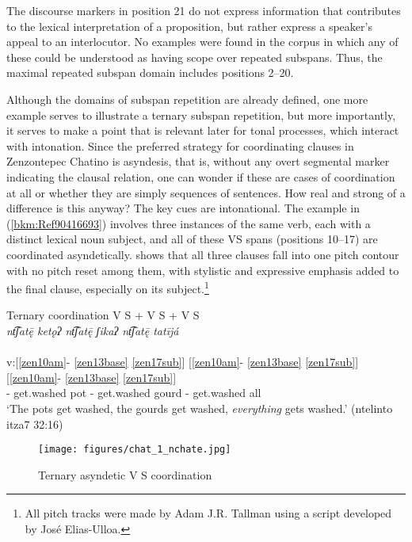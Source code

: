\documentclass[output=paper]{langscibook}
\begin{document}
The discourse markers in position 21 do not express information that contributes to the lexical interpretation of a proposition, but rather express a spea\-ker's appeal to an interlocutor. No examples were found in the corpus in which any of these could be understood as having scope over repeated subspans. Thus, the maximal repeated subspan domain includes positions 2{}--20.

Although the domains of subspan repetition are already defined, one more example serves to illustrate a ternary subspan repetition, but more importantly, it serves to make a point that is relevant later for tonal processes, which interact with intonation. Since the preferred strategy for coordinating clauses in Zenzontepec Chatino is asyndesis, that is, without any overt segmental marker indicating the clausal relation, one can wonder if these are cases of coordination at all or whether they are simply sequences of sentences. How real and strong of a difference is this anyway? The key cues are intonational. The example in (\ref{bkm:Ref90416693}) involves three instances of the same verb, each with a distinct lexical noun subject, and all of these VS spans (positions 10{}--17) are coordinated asyndetically.  shows that all three clauses fall into one pitch contour with no pitch reset among them, with stylistic and expressive emphasis added to the final clause, especially on its subject.\footnote{All pitch tracks were made by Adam J.R. Tallman using a script developed by José Elias-Ulloa.}

\ea\label{bkm:Ref90416693}Ternary coordination V S + V S + V S\\
\textit{ nt͡ʃat\={ę} ketǫʔ nt͡ʃat\={ę} ʃikaʔ nt͡ʃat\={ę} tatījá}\\
\glll [n- t͡ʃat\={ę} ketǫʔ] [n- t͡ʃat\={ę} ʃikaʔ] [n- t͡ʃat\={ę} tatījá]\\
v:[\ref{zen10am}{}- \ref{zen13base} \ref{zen17sub}] [\ref{zen10am}{}- \ref{zen13base} \ref{zen17sub}] [\ref{zen10am}{}- \ref{zen13base} \ref{zen17sub}] \\
\Hab{}- get.washed pot \Hab{}- get.washed gourd \Hab{}- get.washed all\\
\glt `The pots get washed, the gourds get washed, \textit{everything} gets washed.' (ntelinto itza7 32:16)
\z

\begin{figure}[t]
    \centering
    \texttt{[image: figures/chat\_1\_nchate.jpg]}
    \caption{Ternary asyndetic V S coordination}
    \label{fig:chat:key:1}
\end{figure}
\end{document}
